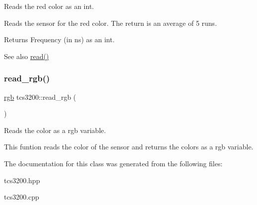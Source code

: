Reads the red color as an int. 

Reads the sensor for the red color. The return is an average of 5 runs. \begin{DoxyReturn}{Returns}
Frequency (in ns) as an int. 
\end{DoxyReturn}
\begin{DoxySeeAlso}{See also}
\hyperlink{classtcs3200_a02b9d9553e97b38bd3aab87bc5ea84b2}{read()} 
\end{DoxySeeAlso}
\mbox{\label{classtcs3200_ad2d5daf026a53178ea90f62f7f8b0adb}} 
\subsubsection{\texorpdfstring{read\+\_\+rgb()}{read\_rgb()}}
{\footnotesize\ttfamily \hyperlink{structrgb}{rgb} tcs3200\+::read\+\_\+rgb (\begin{DoxyParamCaption}{ }\end{DoxyParamCaption})\hspace{0.3cm}{\ttfamily [inline]}}



Reads the color as a rgb variable. 

This funtion reads the color of the sensor and returns the colors as a rgb variable. 

The documentation for this class was generated from the following files\+:\begin{DoxyCompactItemize}
\item 
tcs3200.\+hpp\item 
tcs3200.\+cpp\end{DoxyCompactItemize}
